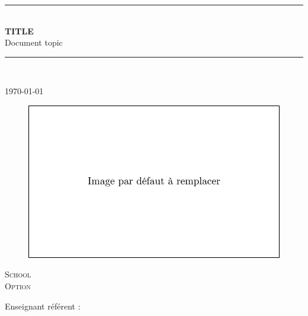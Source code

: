 \newcommand{\HRule}{\rule{\linewidth}{0.5mm}} %

\vspace*{1cm}

\begin{center} %
	\HRule \\[0.2cm] %
	\Large
	\textbf{
		TITLE
		}\\ %
	\vspace{1cm}
Document topic \\

	\large
	\HRule \\[1.5cm] %
	\normalsize
	\author{[AUTOR]}
	\today %
\end{center}

\begin{figure}[h!] %
	\centering
	\includegraphics[width=0.6\linewidth]{./img-data/default.png}
\end{figure}

\vspace{2cm}

\begin{center}\large %
	\textsc{School}\\
	\textsc{Option}
\end{center}

\vspace{2cm}

\noindent
Enseignant référent : 
\vspace{2cm}
